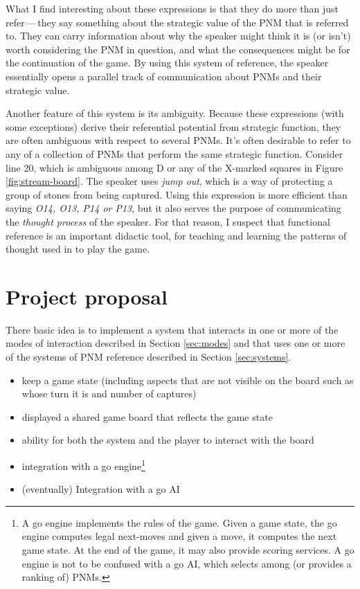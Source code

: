 \documentclass{scrartcl}
\begin{document}
What I find interesting about these expressions is that they do more than
just refer\,---\,they say something about the strategic value of the PNM
that is referred to. 
They can carry information about why the speaker might think it is (or isn't)
worth considering the PNM in question, and what the consequences might be for
the continuation of the game.
By using this system of reference, the speaker essentially opens a  
parallel track of communication about PNMs and their strategic value.

Another feature of this system is its ambiguity. 
Because these expressions (with some exceptions) derive their referential
potential from strategic function, they are often ambiguous with respect
to several PNMs.
It's often desirable to refer to any of a collection of PNMs that perform
the same strategic function. Consider line 20, 
which is ambiguous among D or any of the X-marked squares in Figure \ref{fig:stream-board}. 
The speaker uses \textit{jump out}, which is a way of protecting a group of stones from
being captured.
Using this expression is more efficient than saying \textit{O14, O13, P14 or P13},
but it also serves the purpose of communicating the \emph{thought process}
of the speaker.
For that reason, I suspect that functional reference is an important didactic tool,
for teaching and learning the patterns of thought used in to play the game.


\section{Project proposal}\label{sec:proposal}

There basic idea is to implement a system that interacts in one or more 
of the modes of interaction described in Section \ref{sec:modes} 
and that uses one or more of the systems of PNM reference described in Section \ref{sec:systems}.

\begin{itemize}
  \item keep a game state (including aspects that are not visible on the board such as whose turn it is and number of captures)
  \item displayed a shared game board that reflects the game state
  \item ability for both the system and the player to interact with the board
  \item integration with a go engine\footnote{A go engine implements the rules of the game.
      Given a game state, the go engine 
      computes legal next-moves and given a move, it computes the next game state.
      At the end of the game, it may also provide scoring services.
      A go engine is not to be confused with a go AI, which selects among (or provides a ranking of)
      PNMs.}
  \item (eventually) Integration with a go AI
\end{itemize}
\end{document}
